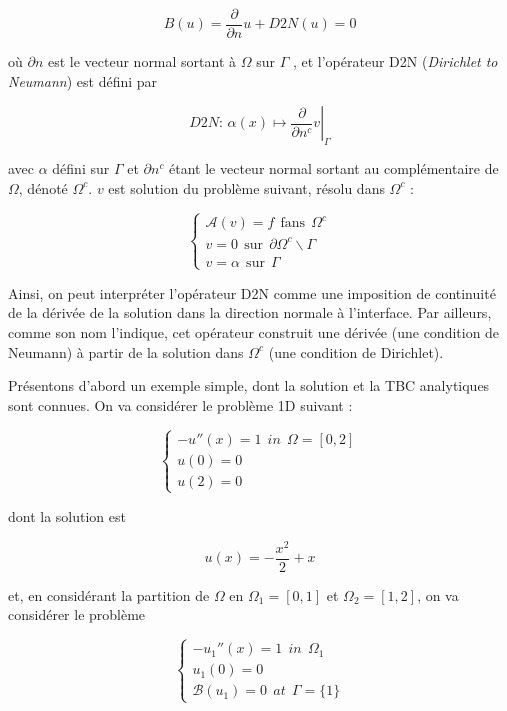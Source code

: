 \begin{equation}
\label{eq:exactTBC}
B(u) = \frac{\partial}{\partial n}u + D2N(u) = 0
\end{equation}

\noindent où $\partial n$ est le vecteur normal sortant à $\Omega$ sur $\Gamma$ , et l'opérateur D2N (\emph{Dirichlet to Neumann}) est défini par

$$\left. D2N \text{: } \alpha(x) \mapsto \frac{\partial}{\partial n^c}v \right\rvert_{\Gamma}$$

\noindent avec $\alpha$ défini sur $\Gamma$ et $\partial n^c$ étant le vecteur normal sortant au complémentaire de $\Omega$, dénoté $\Omega^c$. $v$ est solution du problème suivant, résolu dans $\Omega^c$ : 

\begin{equation*}
\begin{cases}
\mathcal{A}(v) = f \ \ \text{fans} \ \ \Omega^c\\
v = 0 \ \ \text{sur} \ \ \partial \Omega^c \backslash \Gamma \\
v = \alpha \ \ \text{sur} \ \ \Gamma
\end{cases}
\end{equation*}

\indent Ainsi, on peut interpréter l'opérateur D2N comme une imposition de continuité de la dérivée de la solution dans la direction normale à l'interface. Par ailleurs, comme son nom l'indique, cet opérateur construit une dérivée (une condition de Neumann) à partir de la solution dans $\Omega^c$ (une condition de Dirichlet).

\indent Présentons d'abord un exemple simple, dont la solution et la TBC analytiques sont connues. On va considérer le problème 1D suivant :

\begin{equation*}
\begin{cases}
-u''(x) = 1 \ \ in \ \ \Omega = [0,2]\\
u(0) = 0 \\
u(2) = 0
\end{cases}
\end{equation*}

\noindent dont la solution est

$$u(x) = -\frac{x^2}{2} + x$$

\noindent et, en considérant la partition de $\Omega$ en $\Omega_1 = [0,1]$ et $\Omega_2 = [1,2]$, on va considérer le problème

\begin{equation*}
\begin{cases}
-u_1''(x) = 1 \ \ in \ \ \Omega_1\\
u_1(0) = 0 \\
\mathcal{B}(u_1) = 0 \ \ at \ \ \Gamma=\{1\}
\end{cases}
\end{equation*}


